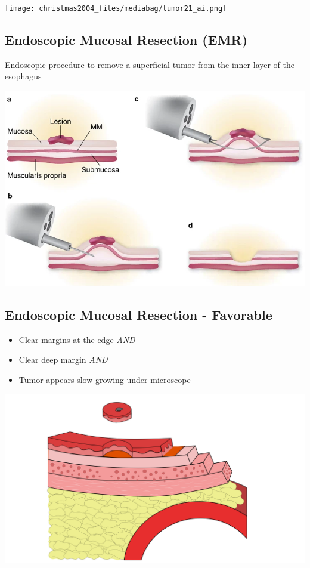 \documentclass[
  letterpaper,
  DIV=11,
  numbers=noendperiod]{scrartcl}
\providecommand{\tightlist}{%
  \setlength{\itemsep}{0pt}\setlength{\parskip}{0pt}}\usepackage{longtable,booktabs,array}
\begin{document}
\texttt{[image: christmas2004\_files/mediabag/tumor21\_ai.png]}

\subsection{Endoscopic Mucosal Resection
(EMR)}\label{endoscopic-mucosal-resection-emr}

Endoscopic procedure to remove a superficial tumor from the inner layer
of the esophagus

\includegraphics{christmas2004_files/mediabag/emr_comm.png}

\subsection{Endoscopic Mucosal Resection -
Favorable}\label{endoscopic-mucosal-resection---favorable}

\begin{itemize}
\tightlist
\item
  Clear margins at the edge \emph{AND}
\item
  Clear deep margin \emph{AND}
\item
  Tumor appears slow-growing under microscope
\end{itemize}

\includegraphics{christmas2004_files/mediabag/emr_favorable.png}
\end{document}
